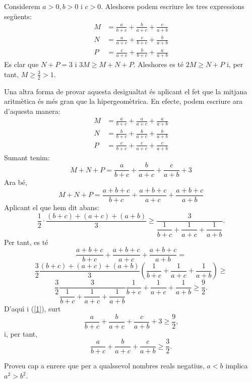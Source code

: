 \begin{solucio}
Considerem $a>0,b>0$ i $c>0$. Aleshores podem escriure les tres expressions
seg\"{u}ents:%
\begin{align*}
M  &  =\frac{a}{b+c}+\frac{b}{a+c}+\frac{c}{a+b}\\
N  &  =\frac{a}{a+c}+\frac{c}{b+c}+\frac{b}{a+b}\\
P  &  =\frac{c}{a+c}+\frac{b}{b+c}+\frac{a}{a+b}%
\end{align*}
Es clar que $N+P=3$ i $3M\geq M+N+P$. Aleshores es t\'{e} $2M\geq N+P$ i, per
tant, $M\geq\frac{3}{2}>1$.

Una altra forma de provar aquesta desigualtat \'{e}s aplicant el fet que la
mitjana aritm\`{e}tica \'{e}s m\'{e}s gran que la hipergeom\`{e}trica. En
efecte, podem escriure ara d'aquesta manera:
\begin{align*}
M  &  =\frac{a}{b+c}+\frac{a}{a+c}+\frac{a}{a+b}\\
N  &  =\frac{b}{b+c}+\frac{b}{a+c}+\frac{b}{a+b}\\
P  &  =\frac{c}{b+c}+\frac{c}{a+c}+\frac{c}{a+b}%
\end{align*}
Sumant tenim:%
\begin{equation}
M+N+P=\frac{a}{b+c}+\frac{b}{a+c}+\frac{c}{a+b}+3 \label{1}%
\end{equation}
Ara b\'{e},%
\[
M+N+P=\frac{a+b+c}{b+c}+\frac{a+b+c}{a+c}+\frac{a+b+c}{a+b}%
\]
Aplicant el que hem dit abans:\qquad%
\[
\frac{1}{2}\cdot\frac{(b+c)+(a+c)+(a+b)}{3}\geq\frac{3}{\dfrac{1}{b+c}%
+\dfrac{1}{a+c}+\dfrac{1}{a+b}}\text{.}%
\]
Per tant, es t\'{e}%
\[
\frac{a+b+c}{b+c}+\frac{a+b+c}{a+c}+\frac{a+b+c}{a+b}=
\]%
\[
\frac{3}{2}\frac{(b+c)+(a+c)+(a+b)}{3}\left(  \dfrac{1}{b+c}+\dfrac{1}%
{a+c}+\dfrac{1}{a+b}\right)  \geq
\]%
\[
\frac{3}{2}\frac{3}{\dfrac{1}{b+c}+\dfrac{1}{a+c}+\dfrac{1}{a+b}}\dfrac
{1}{b+c}+\dfrac{1}{a+c}+\dfrac{1}{a+b}\geq\frac{9}{2}\text{.}%
\]
D'aqu\'{\i} i (\ref{1}), surt%
\[
\frac{a}{b+c}+\frac{b}{a+c}+\frac{c}{a+b}+3\geq\frac{9}{2}\text{,}%
\]
i, per tant,%
\[
\frac{a}{b+c}+\frac{b}{a+c}+\frac{c}{a+b}\geq\frac{3}{2}\text{.}%
\]

\end{solucio}

\begin{exer}
Proveu cap a enrere que per a qualssevol nombres reals negatius, $a<b$ implica
$a^{2}>b^{2}$.
\end{exer}

